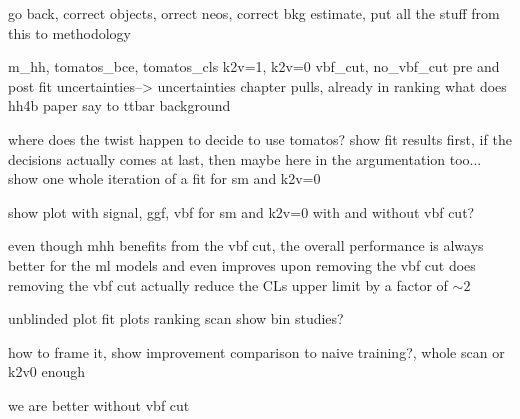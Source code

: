 go back, correct objects,  orrect neos, correct bkg estimate, put all the stuff from this to methodology

m_hh, tomatos_bce, tomatos_cls
k2v=1, k2v=0
vbf_cut, no_vbf_cut
pre and post fit 
uncertainties--> uncertainties chapter
pulls, already in ranking
what does hh4b paper say to ttbar background


where does the twist happen to decide to use tomatos? show fit results first, if the decisions actually comes at last, then maybe here in the argumentation too...
show one whole iteration of a fit for sm and k2v=0

show plot with signal, ggf, vbf for sm and k2v=0 with and without vbf cut?

even though mhh benefits from the vbf cut, the overall performance is always better for the \ac{ml} models and even improves upon removing the vbf cut
does removing the vbf cut actually reduce the CLs upper limit by a factor of $\sim 2$

unblinded plot
fit plots
ranking
scan
show bin studies?

how to frame it, show improvement comparison to naive training?, whole scan or k2v0 enough

we are better without vbf cut



